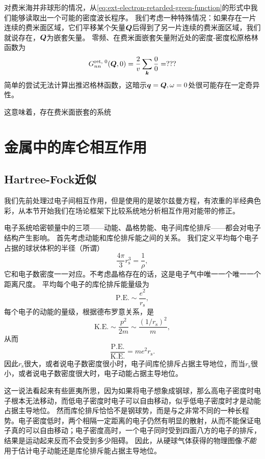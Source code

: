 对费米海并非球形的情况，从\eqref{eq:ext-electron-retarded-green-function}的形式中我们能够读取出一个可能的密度波长程序。
我们考虑一种特殊情况：如果存在一片连续的费米面区域，它们平移某个矢量$\vb*{Q}$后得到了另一片连续的费米面区域，我们就说存在，$\vb*{Q}$为嵌套矢量。
零频、在费米面嵌套矢量附近处的密度-密度松原格林函数为
\[
    G_{nn}^\text{ret, 0}(\vb*{Q}, 0) = \frac{2}{v} \sum_{\vb*{k}} \frac{0}{0} = ???
\]
简单的尝试无法计算出推迟格林函数，这暗示$\vb*{q} = \vb*{Q}, \omega = 0$处很可能存在一定奇异性。


这意味着，存在费米面嵌套的系统

\chapter{金属中的库仑相互作用}

\section{Hartree-Fock近似}\label{sec:hartree-fock-approximation}

我们先前处理过电子间相互作用，但是使用的是玻尔兹曼方程，有浓重的半经典色彩，从本节开始我们在场论框架下比较系统地分析相互作用对能带的修正。

电子系统哈密顿量中的三项——动能、晶格势能、电子间库伦排斥——都会对电子结构产生影响。
首先考虑动能和库伦排斥能之间的关系。
我们定义平均每个电子占据的球状体积的半径（所谓）
\begin{equation}
    \frac{4\pi}{3} r_\text{s}^3 = \frac{1}{\rho},
\end{equation}
它和电子数密度一一对应。不考虑晶格存在的话，这是电子气中唯一一个唯一一个距离尺度。
平均每个电子的库伦排斥能量级为
\[
    \text{P.E.} \sim \frac{e^2}{r_\text{s}},
\]
每个电子的动能的量级，根据德布罗意关系，是
\[
    \text{K.E.} \sim \frac{p^2}{2m} \sim \frac{(1/r_\text{s})^2}{m},
\]
从而
\begin{equation}
    \frac{\text{P.E.}}{\text{K.E.}} = me^2 r_\text{s}.
\end{equation}
因此$r_\text{s}$很大，或者说电子数密度很小时，电子间库伦排斥占据主导地位，而当$r_\text{s}$很小，或者说电子数密度很大时，电子动能占据主导地位。

这一说法看起来有些匪夷所思，因为如果将电子想象成钢球，那么高电子密度时电子根本无法移动，而低电子密度时电子可以自由移动，似乎低电子密度时才是动能占据主导地位。
然而库伦排斥恰恰不是钢球势，而是与之非常不同的一种长程势。电子密度低时，两个相隔一定距离的电子仍然有明显的散射，从而不能保证电子真的可以自由移动；电子密度高时，一个电子同时受到四面八方的电子的排斥，结果是运动起来反而不会受到多少阻碍。
因此，从硬球气体获得的物理图像\emph{不能}用于估计电子动能还是库伦排斥能占据主导地位。

